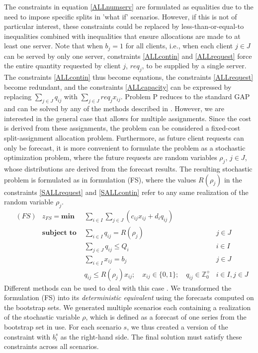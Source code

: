 \documentclass[11pt]{article}
\begin{document}
{ 
The constraints in equation \ref{ALLnumserv} are formulated as equalities due to the need to impose specific splits in 'what if' scenarios. However, if this is not of particular interest, these constraints could be replaced by less-than-or-equal-to inequalities combined with inequalities that ensure allocations are made to at least one server.
Note that when $b_j = 1$ for all clients, i.e., when each client $j \in J$ can be served by only one server, constraints \ref{ALLcontin} and \ref{ALLrequest} force the entire quantity requested by client $j$, $req_j$, to be supplied by a single server. The constraints \ref{ALLcontin} thus become equations, the constraints \ref{ALLrequest} become redundant, and the constraints \ref{ALLcapacity} can be expressed by replacing $\sum_{j \in J}q_{ij}$ with $\sum_{j \in J}req_j x_{ij}$. Problem P reduces to the standard GAP and can be solved by any of the methods described in \citet{matheuristics}.
}
However, we are interested in the general case that allows for multiple assignments. Since the cost is derived from these assignments, the problem can be considered a fixed-cost split-assignment allocation problem.
Furthermore, as future client requests can only be forecast, it is more convenient to formulate the problem as a stochastic optimization problem, where the future requests are random variables $\rho_j$, $j \in J$, whose distributions are derived from the forecast results. The resulting stochastic problem is formulated as in formulation (FS), where the values $R(\rho_j)$ in the constraints \ref{SALLrequest} and \ref{SALLcontin} refer to any same realization of the random variable $\rho_j$.
\begin{align}
	&(FS) & z_{FS} = \textbf{min } & \sum_{i \in I} \sum_{j \in J} ( c_{ij}x_{ij} + d_i q_{ij} ) \label{SALLobj}\\
	& &  \textbf{subject to }
	& \sum_{i \in I} q_{ij} = R(\rho_j) & j \in J  \label{SALLrequest}\\
	& &  & \sum_{j \in J}q_{ij} \leq Q_i & i \in I \label{SALLcapacity}\\
	& &  & \sum_{i \in I} x_{ij} = b_j & j \in J  \label{SALLnumserv}\\
	& &  & q_{ij} \leq R(\rho_j) x_{ij}; \quad  x_{ij} \in \{0,1\}; \quad q_{ij} \in \mathbb{Z}^+_0 & i \in I, j \in J \label{SALLcontin}
\end{align}
Different methods can be used to deal with this case \citep{SDR09}. We transformed the formulation (FS) into its {\it deterministic equivalent} \citep{D55} using the forecasts computed on the bootstrap sets. We generated multiple scenarios each containing a realization of the stochastic variable $\rho$, which is defined as a forecast of one series from the bootstrap set in use. For each scenario $s$, we thus created a version of the constraint with $b_i^{s}$ as the right-hand side. The final solution must satisfy these constraints across all scenarios.
\end{document}
